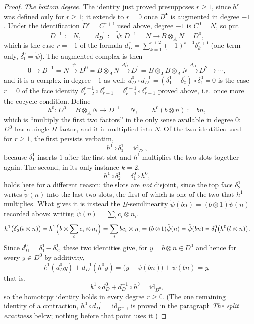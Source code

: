 \begin{proof}
\emph{The bottom degree.}  The identity just proved presupposes $r\ge1$,
since $h^r$ was defined only for $r\ge1$; it extends to $r=0$ once
$D^\bullet$ is augmented in degree $-1$.  Under the identification
$D^r=C^{r+1}$ used above, degree $-1$ is $C^0=N$, so put
\[
D^{-1}:=N,\qquad
d^{-1}_D:=\widetilde\psi:D^{-1}=N\longrightarrow B\otimes_AN=D^0,
\]
which is the case $r=-1$ of the formula
$d^r_D=\sum_{k=1}^{r+2}(-1)^{k-1}\delta^{r+1}_k$ (one term only,
$\delta^0_1=\widetilde\psi$).  The augmented complex is then
\[
0\to D^{-1}=N\xrightarrow{\ \widetilde\psi\ }D^0=B\otimes_AN
\xrightarrow{\ d^0_D\ }D^1=B\otimes_AB\otimes_AN
\xrightarrow{\ d^1_D\ }D^2\to\cdots,
\]
and it is a complex in degree $-1$ as well:
$d^0_D\circ d^{-1}_D=(\delta^1_1-\delta^1_2)\circ\delta^0_1=0$ is the
case $r=0$ of the face identity
$\delta^{r+1}_{r+2}\circ\delta^r_{r+1}=\delta^{r+1}_{r+1}\circ\delta^r_{r+1}$
proved above, i.e.\ once more the cocycle condition.  Define
\[
h^0:D^0=B\otimes_AN\longrightarrow D^{-1}=N,\qquad
h^0(b\otimes n):=bn,
\]
which is ``multiply the first two factors'' in the only sense available
in degree $0$: $D^0$ has a single $B$-factor, and it is multiplied into
$N$.  Of the two identities used for $r\ge1$, the first persists
verbatim,
\[
h^1\circ\delta^1_1=\mathrm{id}_{D^0},
\]
because $\delta^1_1$ inserts $1$ after the first slot and $h^1$
multiplies the two slots together again.  The second, in its only
instance $k=2$,
\[
h^1\circ\delta^1_2=\delta^0_1\circ h^0,
\]
holds here for a different reason: the slots are \emph{not} disjoint,
since the top face $\delta^1_2$ writes $\widetilde\psi(n)$ into the last
two slots, the first of which is one of the two that $h^1$ multiplies.
What gives it is instead the $B$-semilinearity
$\widetilde\psi(bn)=(b\otimes1)\widetilde\psi(n)$ recorded above:
writing $\widetilde\psi(n)=\sum_ic_i\otimes n_i$,
\[
h^1\bigl(\delta^1_2(b\otimes n)\bigr)
=h^1\Bigl(b\otimes\sum_ic_i\otimes n_i\Bigr)
=\sum_ibc_i\otimes n_i=(b\otimes1)\widetilde\psi(n)=\widetilde\psi(bn)
=\delta^0_1\bigl(h^0(b\otimes n)\bigr).
\]
Since $d^0_D=\delta^1_1-\delta^1_2$, these two identities give, for
$y=b\otimes n\in D^0$ and hence for every $y\in D^0$ by additivity,
\[
h^1(d^0_Dy)+d^{-1}_D(h^0y)
=\bigl(y-\widetilde\psi(bn)\bigr)+\widetilde\psi(bn)=y,
\]
that is,
\[
h^1\circ d^0_D+d^{-1}_D\circ h^0=\mathrm{id}_{D^0},
\]
so the homotopy identity holds in every degree $r\ge0$.  (The one
remaining identity of a contraction,
$h^0\circ d^{-1}_D=\mathrm{id}_{D^{-1}}$, is proved in the paragraph
\emph{The split exactness} below; nothing before that point uses it.)


\end{proof}
